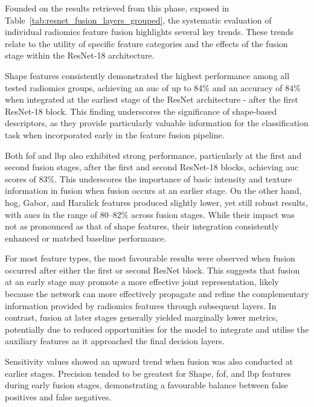 Founded on the results retrieved from this phase, exposed in Table~\ref{tab:resnet_fusion_layers_grouped}, the systematic evaluation of individual radiomics feature fusion highlights several key trends. These trends relate to the utility of specific feature categories and the effects of the fusion stage within the ResNet-18 architecture.

Shape features consistently demonstrated the highest performance among all tested radiomics groups, achieving an \ac{auc} of up to 84\% and an accuracy of 84\% when integrated at the earliest stage of the ResNet architecture - after the first ResNet-18 block. This finding underscores the significance of shape-based descriptors, as they provide particularly valuable information for the classification task when incorporated early in the feature fusion pipeline.

Both \ac{fof} and \ac{lbp} also exhibited strong performance, particularly at the first and second fusion stages, after the first and second ResNet-18 blocks, achieving \ac{auc} scores of 83\%. This underscores the importance of basic intensity and texture information in fusion when fusion occurs at an earlier stage. 
On the other hand, \ac{hog}, Gabor, and Haralick features produced slightly lower, yet still robust results, with \acp{auc} in the range of 80–82\% across fusion stages. While their impact was not as pronounced as that of shape features, their integration consistently enhanced or matched baseline performance.

For most feature types, the most favourable results were observed when fusion occurred after either the first or second ResNet block.
This suggests that fusion at an early stage may promote a more effective joint representation, likely because the network can more effectively propagate and refine the complementary information provided by radiomics features through subsequent layers.
 In contrast, fusion at later stages generally yielded marginally lower metrics, potentially due to reduced opportunities for the model to integrate and utilise the auxiliary features as it approached the final decision layers.

Sensitivity values showed an upward trend when fusion was also conducted at earlier stages. Precision tended to be greatest for Shape, \ac{fof}, and \ac{lbp} features during early fusion stages, demonstrating a favourable balance between false positives and false negatives.

